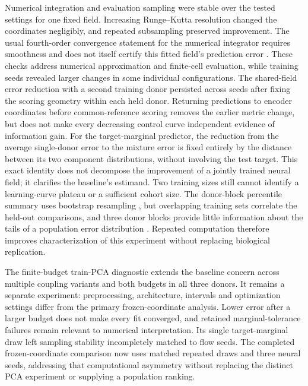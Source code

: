 Numerical integration and evaluation sampling were stable over the tested settings for one fixed field. Increasing Runge--Kutta resolution changed the coordinates negligibly, and repeated subsampling preserved improvement. The usual fourth-order convergence statement for the numerical integrator requires smoothness and does not itself certify this fitted field's prediction error \citep{hairer1993}. These checks address numerical approximation and finite-cell evaluation, while training seeds revealed larger changes in some individual configurations. The shared-field error reduction with a second training donor persisted across seeds after fixing the scoring geometry within each held donor. Returning predictions to encoder coordinates before common-reference scoring removes the earlier metric change, but does not make every decreasing control curve independent evidence of information gain. For the target-marginal predictor, the reduction from the average single-donor error to the mixture error is fixed entirely by the distance between its two component distributions, without involving the test target. This exact identity does not decompose the improvement of a jointly trained neural field; it clarifies the baseline's estimand. Two training sizes still cannot identify a learning-curve plateau or a sufficient cohort size. The donor-block percentile summary uses bootstrap resampling \citep{efron1993bootstrap}, but overlapping training sets correlate the held-out comparisons, and three donor blocks provide little information about the tails of a population error distribution \citep{bengio2004,vabalas2019}. Repeated computation therefore improves characterization of this experiment without replacing biological replication.

The finite-budget train-PCA diagnostic extends the baseline concern across multiple coupling variants and both budgets in all three donors. It remains a separate experiment: preprocessing, architecture, intervals and optimization settings differ from the primary frozen-coordinate analysis. Lower error after a larger budget does not make every fit converged, and retained marginal-tolerance failures remain relevant to numerical interpretation. Its single target-marginal draw left sampling stability incompletely matched to flow seeds. The completed frozen-coordinate comparison now uses matched repeated draws and three neural seeds, addressing that computational asymmetry without replacing the distinct PCA experiment or supplying a population ranking.

